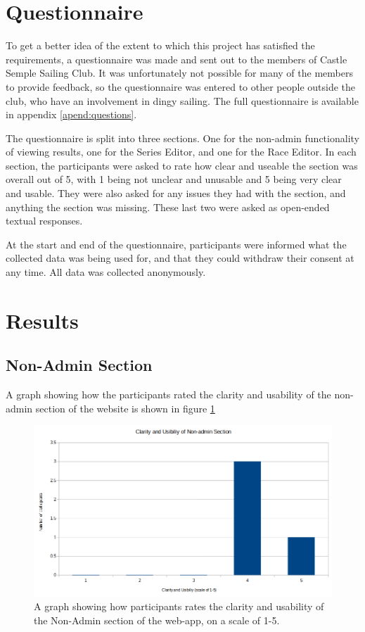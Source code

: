 \documentclass{l4proj}
\begin{document}
\section{Questionnaire}

To get a better idea of the extent to which this project has satisfied the requirements, a questionnaire was made and sent out to the members of Castle Semple Sailing Club. It was unfortunately not possible for many of the members to provide feedback, so the questionnaire was entered to other people outside the club, who have an involvement in dingy sailing. The full questionnaire is available in appendix \ref{apend:questions}.

The questionnaire is split into three sections. One for the non-admin functionality of viewing results, one for the Series Editor, and one for the Race Editor. In each section, the participants were asked to rate how clear and useable the section was overall out of 5, with 1 being not unclear and unusable and 5 being very clear and usable. They were also asked for any issues they had with the section, and anything the section was missing. These last two were asked as open-ended textual responses.

At the start and end of the questionnaire, participants were informed what the collected data was being used for, and that they could withdraw their consent at any time. All data was collected anonymously.

\section{Results}

\subsection{Non-Admin Section}
A graph showing how the participants rated the clarity and usability of the non-admin section of the website is shown in figure \ref{fig:results1}

\begin{figure}[H]
    \centering
    \includegraphics[width=1\linewidth]{images/Results 1.png} 

    \caption{A graph showing how participants rates the clarity and usability of the Non-Admin section of the web-app, on a scale of 1-5.
    }

    \label{fig:results1}
\end{figure}
\end{document}
